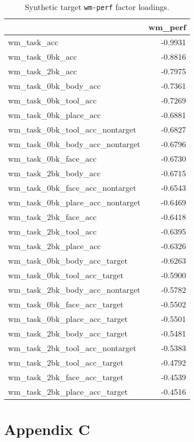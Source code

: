 \documentclass{article}
\begin{document}
\begin{table}
\centering
\begin{tabular}{lr}
\toprule
 & wm\_perf \\
\midrule
wm\_task\_acc & -0.9931 \\
wm\_task\_0bk\_acc & -0.8816 \\
wm\_task\_2bk\_acc & -0.7975 \\
wm\_task\_0bk\_body\_acc & -0.7361 \\
wm\_task\_0bk\_tool\_acc & -0.7269 \\
wm\_task\_0bk\_place\_acc & -0.6881 \\
wm\_task\_0bk\_tool\_acc\_nontarget & -0.6827 \\
wm\_task\_0bk\_body\_acc\_nontarget & -0.6796 \\
wm\_task\_0bk\_face\_acc & -0.6730 \\
wm\_task\_2bk\_body\_acc & -0.6715 \\
wm\_task\_0bk\_face\_acc\_nontarget & -0.6543 \\
wm\_task\_0bk\_place\_acc\_nontarget & -0.6469 \\
wm\_task\_2bk\_face\_acc & -0.6418 \\
wm\_task\_2bk\_tool\_acc & -0.6395 \\
wm\_task\_2bk\_place\_acc & -0.6326 \\
wm\_task\_0bk\_body\_acc\_target & -0.6263 \\
wm\_task\_0bk\_tool\_acc\_target & -0.5900 \\
wm\_task\_2bk\_body\_acc\_nontarget & -0.5782 \\
wm\_task\_0bk\_face\_acc\_target & -0.5502 \\
wm\_task\_0bk\_place\_acc\_target & -0.5501 \\
wm\_task\_2bk\_body\_acc\_target & -0.5481 \\
wm\_task\_2bk\_tool\_acc\_nontarget & -0.5383 \\
wm\_task\_2bk\_tool\_acc\_target & -0.4792 \\
wm\_task\_2bk\_face\_acc\_target & -0.4539 \\
wm\_task\_2bk\_place\_acc\_target & -0.4516 \\
\bottomrule
\end{tabular}

\footnotesize
\caption{Synthetic target \texttt{wm-perf} factor loadings.}
\normalsize
\label{tab:wm-perf}
\end{table}

\section{Appendix C} \label{sec:appendix-c}
\end{document}
